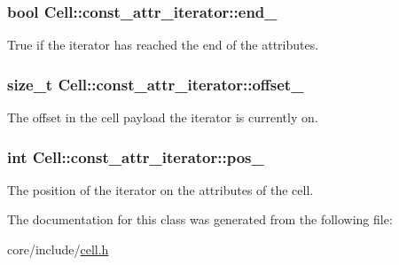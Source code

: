 \subsubsection[{end\+\_\+}]{\setlength{\rightskip}{0pt plus 5cm}bool Cell\+::const\+\_\+attr\+\_\+iterator\+::end\+\_\+\hspace{0.3cm}{\ttfamily [private]}}\label{classCell_1_1const__attr__iterator_a77098fc229edb47e74f036e392ff59c1}
True if the iterator has reached the end of the attributes. \hypertarget{classCell_1_1const__attr__iterator_ac6d82b8089c04a24ef74cd1a6317d8f6}{}
\subsubsection[{offset\+\_\+}]{\setlength{\rightskip}{0pt plus 5cm}size\+\_\+t Cell\+::const\+\_\+attr\+\_\+iterator\+::offset\+\_\+\hspace{0.3cm}{\ttfamily [private]}}\label{classCell_1_1const__attr__iterator_ac6d82b8089c04a24ef74cd1a6317d8f6}
The offset in the cell payload the iterator is currently on. \hypertarget{classCell_1_1const__attr__iterator_a304d6a91bd8d2f457c83c53165d373d6}{}
\subsubsection[{pos\+\_\+}]{\setlength{\rightskip}{0pt plus 5cm}int Cell\+::const\+\_\+attr\+\_\+iterator\+::pos\+\_\+\hspace{0.3cm}{\ttfamily [private]}}\label{classCell_1_1const__attr__iterator_a304d6a91bd8d2f457c83c53165d373d6}
The position of the iterator on the attributes of the cell. 

The documentation for this class was generated from the following file\+:\begin{DoxyCompactItemize}
\item 
core/include/\hyperlink{cell_8h}{cell.\+h}\end{DoxyCompactItemize}
